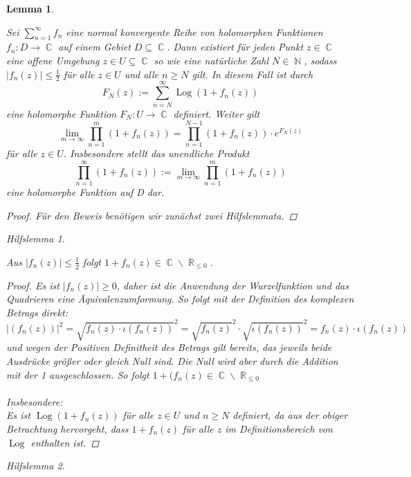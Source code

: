 \documentclass[10pt,a4paper]{article}
\theoremstyle{plain}
\newtheorem{lem}[thm]{Lemma}
\theoremstyle{definition}
\theoremstyle{remark}
\newtheorem{hilfslem}{Hilfslemma}
\DeclareMathOperator{\R}{\mathbb{R}}
\DeclareMathOperator{\C}{\mathbb{C}}
\DeclareMathOperator{\N}{\mathbb{N}}
\DeclareMathOperator{\Log}{Log}
\begin{document}
\begin{lem}\label{lemma12}

Sei $\sum_{n =1}^\infty f_{\textit{n}}$ eine normal konvergente Reihe von holomorphen Funktionen $f_{\textit{n}}: \textit{D}\rightarrow\C $ auf einem Gebiet
$D\subseteq\C$. Dann existiert für jeden Punkt $ z \in \C$ eine offene Umgebung $z \in U \subseteq \C$ so wie eine natürliche Zahl $N \in \N$, sodass $|f_{\textit{n}}(z)| \leq \frac{1}{2}$ für alle $z \in U $ und alle $n \geq N $ gilt. In diesem Fall ist durch $$F_{N}(z) := \sum_{n = N}^\infty \Log( 1 + f_{n}(z))$$ eine holomorphe Funktion $F_{N} : U \rightarrow \C$ definiert. Weiter gilt $$\lim_{m\rightarrow\infty}\prod_{n=1}^m ( 1 + f_{n}(z)) = \prod_{n=1}^{N-1} ( 1 + f_{n}(z))\cdot e^{F_{N}(z)}$$ für alle $z \in U$. Insbesondere stellt das unendliche Produkt$$\prod_{n=1}^\infty ( 1 + f_{n}(z)) := \lim_{m\rightarrow\infty}\prod_{n=1}^m ( 1 + f_{n}(z))$$ eine holomorphe Funktion auf D dar.

\begin{proof}\renewcommand{\qedsymbol}{}
Für den Beweis benötigen wir zunächst zwei Hilfslemmata. 
\end{proof}

\begin{hilfslem}\label{hilfslemma1}

Aus $|f_n(z)|\leq \frac{1}{2}$ folgt $1+f_n(z) \in \C\backslash\R_{\leq 0}$. 

\begin{proof}
Es ist $|f_n(z)|\geq 0$, daher ist die Anwendung der Wurzelfunktion und das Quadrieren eine Äquivalenzumformung. So folgt mit der Definition des komplexen Betrags direkt:
$$|(f_n(z))|^2=\sqrt{f_n(z)\cdot {\iota (f_n(z))}}^2=\sqrt{f_n(z)}^2\cdot\sqrt{{\iota (f_n(z))}}^2= f_n(z)\cdot{\iota (f_n(z))}$$und wegen der Positiven Definitheit des Betrags gilt bereits, das jeweils beide Ausdrücke größer oder gleich Null sind. Die Null wird aber durch die Addition mit der 1 ausgeschlossen. So folgt $1+(f_n(z) \in \C \backslash \R_{\leq 0}$
\\
\\
Insbesondere:
\\
Es ist $\Log( 1 + f_{n}(z))$ für alle $z \in U $ und $n \geq N$ definiert, da aus der obiger Betrachtung hervorgeht, dass $1+f_n(z)$ für alle $z$ im Definitionsbereich von $\Log$ enthalten ist.
\end{proof}
\end{hilfslem}

\begin{hilfslem}\label{hilfslemma2}


\end{hilfslem}
\end{lem}
\end{document}
